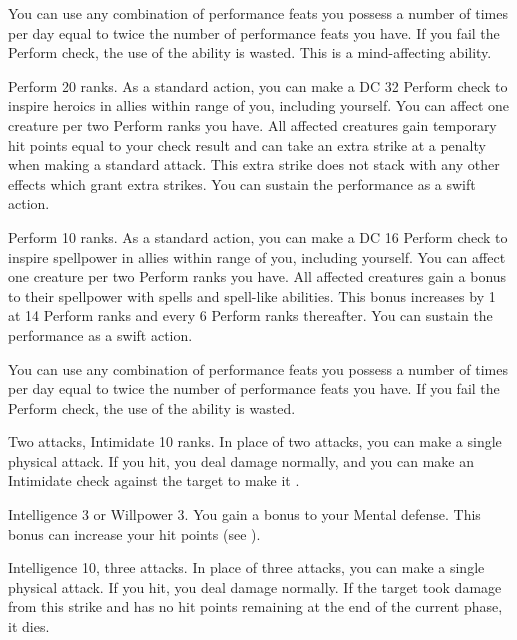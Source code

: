 You can use any combination of performance feats you possess a number of times per day equal to twice the number of performance feats you have.
If you fail the Perform check, the use of the ability is wasted.
This is a mind-affecting ability.

\featpre Perform 20 ranks.
\featben As a standard action, you can make a DC 32 Perform check to inspire heroics in allies within \rngmed range of you, including yourself.
You can affect one creature per two Perform ranks you have.
All affected creatures gain temporary hit points equal to your check result and can take an extra strike at a  penalty when making a standard attack.
This extra strike does not stack with any other effects which grant extra strikes.
You can sustain the performance as a swift action.

\featpre Perform 10 ranks.
\featben As a standard action, you can make a DC 16 Perform check to inspire spellpower in allies within \rngmed range of you, including yourself.
You can affect one creature per two Perform ranks you have.
All affected creatures gain a  bonus to their spellpower with spells and spell-like abilities.
This bonus increases by 1 at 14 Perform ranks and every 6 Perform ranks thereafter.
You can sustain the performance as a swift action.

You can use any combination of performance feats you possess a number of times per day equal to twice the number of performance feats you have.
If you fail the Perform check, the use of the ability is wasted.

\featpres Two attacks, Intimidate 10 ranks.
\featben In place of two attacks, you can make a single physical attack.
If you hit, you deal damage normally, and you can make an Intimidate check against the target to make it \shaken.

\featpre Intelligence 3 or Willpower 3.
\featben You gain a  bonus to your Mental defense.
This bonus can increase your hit points (see ).

\featpre Intelligence 10, three attacks.
\featben In place of three attacks, you can make a single physical attack.
If you hit, you deal damage normally.
If the target took damage from this strike and has no hit points remaining at the end of the current phase, it dies.

